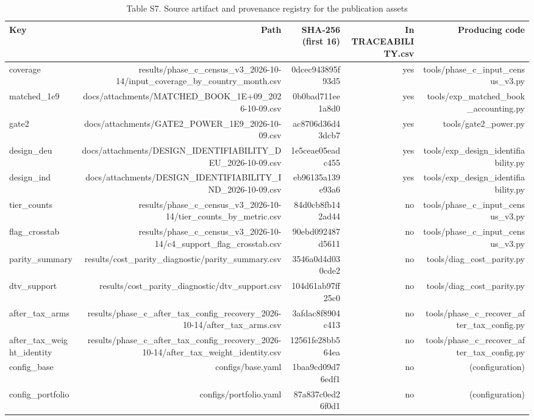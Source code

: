\begin{table}[t]
\centering
\small
\caption{Table S7. Source artifact and provenance registry for the publication assets}
\label{tab:s7}
\begin{tabular}{lrrrr}
\toprule
Key & Path & SHA-256 (first 16) & In TRACEABILITY.csv & Producing code \\
\midrule
coverage & results/phase\_c\_census\_v3\_2026-10-14/input\_coverage\_by\_country\_month.csv & 0dcec943895f93d5 & yes & tools/phase\_c\_input\_census\_v3.py \\
matched\_1e9 & docs/attachments/MATCHED\_BOOK\_1E+09\_2026-10-09.csv & 0b0bad711ee1a8d0 & yes & tools/exp\_matched\_book\_accounting.py \\
gate2 & docs/attachments/GATE2\_POWER\_1E9\_2026-10-09.csv & ac8706d36d43dcb7 & yes & tools/gate2\_power.py \\
design\_deu & docs/attachments/DESIGN\_IDENTIFIABILITY\_DEU\_2026-10-09.csv & 1e5ceae05eadc455 & yes & tools/exp\_design\_identifiability.py \\
design\_ind & docs/attachments/DESIGN\_IDENTIFIABILITY\_IND\_2026-10-09.csv & eb96135a139e93a6 & yes & tools/exp\_design\_identifiability.py \\
tier\_counts & results/phase\_c\_census\_v3\_2026-10-14/tier\_counts\_by\_metric.csv & 84d0cb8fb142ad44 & no & tools/phase\_c\_input\_census\_v3.py \\
flag\_crosstab & results/phase\_c\_census\_v3\_2026-10-14/c4\_support\_flag\_crosstab.csv & 90ebd092487d5611 & no & tools/phase\_c\_input\_census\_v3.py \\
parity\_summary & results/cost\_parity\_diagnostic/parity\_summary.csv & 3546a0d4d030cde2 & no & tools/diag\_cost\_parity.py \\
dtv\_support & results/cost\_parity\_diagnostic/dtv\_support.csv & 104d61ab97ff25c0 & no & tools/diag\_cost\_parity.py \\
after\_tax\_arms & results/phase\_c\_after\_tax\_config\_recovery\_2026-10-14/after\_tax\_arms.csv & 3afdac8f8904c413 & no & tools/phase\_c\_recover\_after\_tax\_config.py \\
after\_tax\_weight\_identity & results/phase\_c\_after\_tax\_config\_recovery\_2026-10-14/after\_tax\_weight\_identity.csv & 12561fe28bb564ea & no & tools/phase\_c\_recover\_after\_tax\_config.py \\
config\_base & configs/base.yaml & 1baa9cd09d76edf1 & no & (configuration) \\
config\_portfolio & configs/portfolio.yaml & 87a837c0ed26f0d1 & no & (configuration) \\

\end{tabular}
\end{table}
